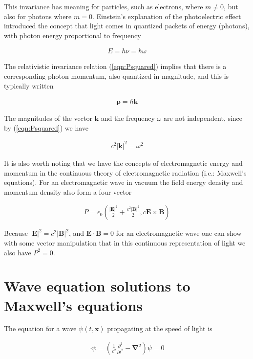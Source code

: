\documentclass[]{eliblog}
\newcommand{\Abs}[1]{{\left\lvert{#1}\right\rvert}}
\newcommand{\BB}[0]{\mathbf{B}}
\newcommand{\BE}[0]{\mathbf{E}}
\newcommand{\Bk}[0]{\mathbf{k}}
\newcommand{\Bp}[0]{\mathbf{p}}
\newcommand{\Bx}[0]{\mathbf{x}}
\newcommand{\cross}[0]{\times}
\newcommand{\spacegrad}[0]{\boldsymbol{\nabla}}
\newcommand{\delambertian}[0]{\square}
\begin{document}
This invariance has meaning for particles, such as electrons, where $m \ne 0$, but also for photons where $m = 0$.  
Einstein's explanation of the photoelectric effect introduced the concept that light comes in
quantized packets of energy (photons), with photon energy proportional to frequency 

\begin{align}
E = h \nu = \hbar \omega
\end{align}

The relativistic invariance relation (\ref{eqn:Psquared}) implies that there is a corresponding photon momentum, also
quantized in magnitude, and this is typically written

\begin{align}
\Bp = \hbar \Bk
\end{align}

The magnitudes of the vector $\Bk$ and the frequency $\omega$ are not independent, since by (\ref{eqn:Psquared}) we have

\begin{align}\label{eqn:omegaKsquared}
c^2 \Abs{\Bk}^2 = \omega^2
\end{align}

It is also worth noting that we have the concepts of electromagnetic energy and momentum in the continuous theory of
electromagnetic radiation (i.e.: Maxwell's equations).  For an electromagnetic wave in vacuum the
field energy density and momentum density also form a four vector

\begin{align}
P = \epsilon_0 \left(\frac{\Abs{\BE}^2}{2} + \frac{c^2 \Abs{\BB}^2}{2}, c \BE \cross \BB \right)
\end{align}

Because $\Abs{\BE}^2 = c^2 \Abs{\BB}^2$, and $\BE \cdot \BB = 0$ for an electromagnetic wave one can show with some vector manipulation that in this continuous representation of light we also have $P^2 = 0$.

\section{Wave equation solutions to Maxwell's equations}

The equation for a wave $\psi(t,\Bx)$ propagating at the speed of light is 

\begin{align}
\delambertian \psi = \left( \frac{1}{c^2}\frac{\partial^2}{{\partial t}^2} - \spacegrad^2 \right) \psi = 0
\end{align}
\end{document}
